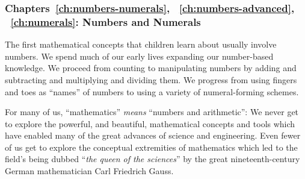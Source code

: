 \subsubsection{Chapters~\ref{ch:numbers-numerals},
~\ref{ch:numbers-advanced}, ~\ref{ch:numerals}: Numbers and Numerals}

The first mathematical concepts that children learn about usually involve numbers.  We spend much of our early lives expanding our number-based knowledge.  We proceed from counting to manipulating numbers by adding and subtracting and multiplying and dividing them.  We progress from using fingers and toes as ``names'' of numbers to using a variety of numeral-forming schemes.

\smallskip

For many of us, ``mathematics'' {\em means} ``numbers and arithmetic'': We never get to explore the powerful, and beautiful, mathematical concepts and tools which have enabled many of the great advances of science and engineering.  Even fewer of us get to explore the conceptual extremities of mathematics which led to the field's being dubbed ``{\em the queen of the  sciences}'' by the great nineteenth-century German mathematician Carl Friedrich Gauss. 


\smallskip

